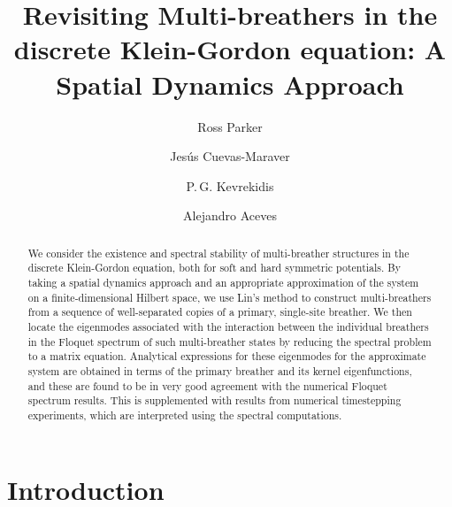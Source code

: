 \documentclass[12pt,reqno]{amsart}
\theoremstyle{definition}
\begin{document}
\title[Revisiting Multi-breathers in the discrete Klein-Gordon equation]{Revisiting Multi-breathers in the discrete Klein-Gordon equation: A Spatial Dynamics Approach}

\author{Ross Parker}
\address{Department of Mathematics, Southern Methodist University, 
Dallas, TX 75275, USA}

\author{Jes\'us Cuevas-Maraver}
\address{Grupo de F\'{\i}sica No Lineal, Departamento de F\'{\i}sica Aplicada I,
Universidad de Sevilla. Escuela Polit\'{e}cnica Superior, C/ Virgen de Africa, 7, 41011-Sevilla, Spain}
\address{Instituto de Matem\'{a}ticas de la Universidad de Sevilla (IMUS). Edificio
Celestino Mutis. Avda. Reina Mercedes s/n, 41012-Sevilla, Spain, Avda Reina Mercedes s/n, E-41012 Sevilla, Spain}

\author{P.\,G. Kevrekidis} 
\address{Department of Mathematics and Statistics, University of Massachusetts, Amherst MA 01003, USA}

\author{Alejandro Aceves}
\address{Department of Mathematics, Southern Methodist University, 
Dallas, TX 75275, USA}

\begin{abstract}
	We consider the existence and spectral stability of multi-breather structures in the discrete Klein-Gordon equation, both for soft and hard symmetric potentials. By taking a spatial dynamics approach and an appropriate approximation of the system on a finite-dimensional Hilbert space, we use Lin's method to construct multi-breathers from a sequence of well-separated copies of a primary, single-site breather. We then locate the eigenmodes associated with the interaction between the
	individual breathers in the Floquet spectrum of such multi-breather
	states by reducing the spectral problem to a matrix equation. Analytical expressions for these eigenmodes for the approximate system are obtained in terms of the primary breather and its kernel eigenfunctions, and these are found to be in very good agreement with the numerical Floquet spectrum results. This is supplemented with results from numerical timestepping experiments, which are interpreted using the spectral computations.
\end{abstract}

\maketitle

\section{Introduction}
\end{document}
